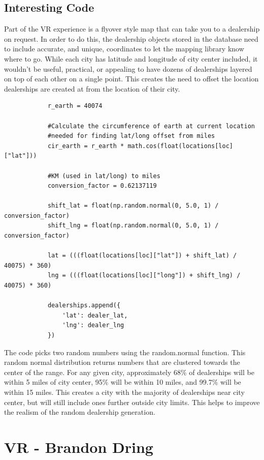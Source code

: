 \documentclass[onecolumn, draftclsnofoot,10pt, compsoc]{IEEEtran}
\begin{document}
    \subsection{Interesting Code}
        Part of the VR experience is a flyover style map that can take you to a dealership on request. In order to do this, the dealership objects stored in the database need to include accurate, and unique, coordinates to let the mapping library know where to go. While each city has latitude and longitude of city center included, it wouldn’t be useful, practical, or appealing to have dozens of dealerships layered on top of each other on a single point. This creates the need to offset the location dealerships are created at from the location of their city.

        \begin{lstlisting}
            r_earth = 40074

            #Calculate the circumference of earth at current location
            #needed for finding lat/long offset from miles
            cir_earth = r_earth * math.cos(float(locations[loc]["lat"]))

            #KM (used in lat/long) to miles
            conversion_factor = 0.62137119

            shift_lat = float(np.random.normal(0, 5.0, 1) / conversion_factor)
            shift_lng = float(np.random.normal(0, 5.0, 1) / conversion_factor)

            lat = (((float(locations[loc]["lat"]) + shift_lat) / 40075) * 360)
            lng = (((float(locations[loc]["long"]) + shift_lng) / 40075) * 360)

            dealerships.append({
                'lat': dealer_lat,
                'lng': dealer_lng
            })
        \end{lstlisting}

        The code picks two random numbers using the random.normal function. This random normal distribution returns numbers that are clustered towards the center of the range. For any given city, approximately 68\% of dealerships will be within 5 miles of city center, 95\% will be within 10 miles, and 99.7\% will be within 15 miles. This creates a city with the majority of dealerships near city center, but will still include ones further outside city limits. This helps to improve the realism of the random dealership generation.
\section{VR - Brandon Dring}
\end{document}
